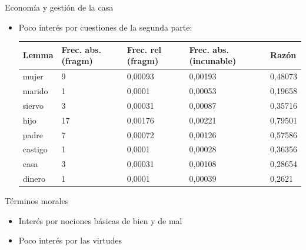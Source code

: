 \documentclass[11pt,aspectratio=169]{beamer}
\begin{document}
\begin{frame}{Economía y gestión de la casa}
\begin{center}
\begin{itemize}
\item Poco interés por cuestiones de la segunda parte:
\begin{table}[!ht]
    \centering
    \begin{tabular}{|l|l|l|l|l|}
    \hline
        \textbf{Lemma} & \textbf{Frec. abs. (fragm)} & \textbf{Frec. rel (fragm)} & \textbf{Frec. abs. (incunable)} & \textbf{Razón} \\ \hline
        mujer & 9 & 0,00093 & 0,00193 & 0,48073 \\ \hline
        marido & 1 & 0,0001 & 0,00053 & 0,19658 \\ \hline
        siervo & 3 & 0,00031 & 0,00087 & 0,35716 \\ \hline
        hijo & 17 & 0,00176 & 0,00221 & 0,79501 \\ \hline
        padre & 7 & 0,00072 & 0,00126 & 0,57586 \\ \hline
        castigo & 1 & 0,0001 & 0,00028 & 0,36356 \\ \hline
        casa & 3 & 0,00031 & 0,00108 & 0,28654 \\ \hline
        dinero & 1 & 0,0001 & 0,00039 & 0,2621 \\ \hline
    \end{tabular}
\end{table}
\end{itemize}

\end{center}
\end{frame}



\begin{frame}{Términos morales}
\begin{center}

\begin{itemize}
\item Interés por nociones básicas de bien y de mal
\item Poco interés por las virtudes
\end{itemize}

\end{center}
\end{frame}
\end{document}
